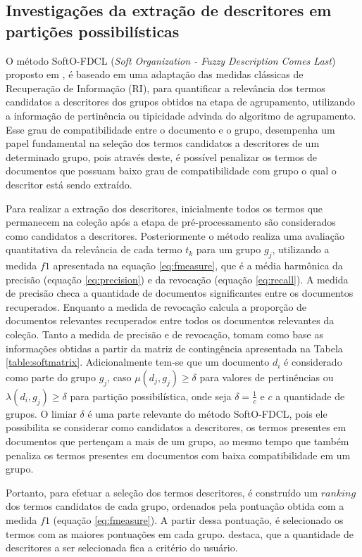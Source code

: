\subsection{Investigações da extração de descritores em partições possibilísticas}

O método SoftO-FDCL ({\it Soft Organization - Fuzzy Description Comes Last}) proposto em 
, é baseado em uma adaptação das medidas clássicas de Recuperação de
Informação (RI), para quantificar a relevância dos termos candidatos a descritores dos grupos
obtidos na etapa de agrupamento, utilizando a informação de pertinência ou tipicidade advinda do
algoritmo de agrupamento.  Esse grau de compatibilidade entre o documento e o grupo, desempenha um
papel fundamental na seleção dos termos candidatos a descritores de um determinado grupo, pois
através deste, é possível penalizar os termos de documentos que possuam baixo grau de
compatibilidade com grupo o qual o descritor está sendo extraído.  

Para realizar a extração dos descritores, inicialmente todos os termos que permanecem na coleção
após a etapa de pré-processamento são considerados como candidatos a descritores. Posteriormente o
método realiza uma avaliação quantitativa da relevância de cada termo $t_k$ para um grupo $g_j$,
utilizando a medida $f1$ apresentada na equação \ref{eq:fmeasure}, que é a média harmônica da
precisão (equação \ref{eq:precision}) e da revocação (equação \ref{eq:recall}).
A medida de precisão checa a quantidade de documentos significantes entre os documentos
recuperados. Enquanto a medida de revocação calcula a proporção de documentos relevantes recuperados
entre todos os documentos relevantes da coleção. Tanto a medida de precisão e de revocação, tomam
como base as informações obtidas a partir da matriz de contingência apresentada na Tabela
\ref{table:softmatrix}. Adicionalmente tem-se que um documento $d_i$ é considerado como parte do
grupo $g_j$, caso $\mu(d_j,g_j) \geq \delta$ para valores de pertinências ou $\lambda(d_i,g_j) \geq
\delta$ para partição possibilística, onde seja $\delta = \frac{1}{c}$ e $c$ a quantidade de
grupos. O limiar $\delta$ é uma parte relevante do método SoftO-FDCL, pois ele possibilita se
considerar como candidatos a descritores, os termos presentes em documentos que pertençam a mais de
um grupo, ao mesmo tempo que também penaliza os termos presentes em documentos com baixa
compatibilidade em um grupo.

Portanto, para efetuar a seleção dos termos descritores, é construído um $ranking$ dos termos
candidatos de cada grupo, ordenados pela pontuação obtida com a medida $f1$ (equação
\ref{eq:fmeasure}). A partir dessa pontuação, é selecionado os termos com as maiores
pontuações em cada grupo.  destaca, que a quantidade de descritores a ser
selecionada fica a critério do usuário.

